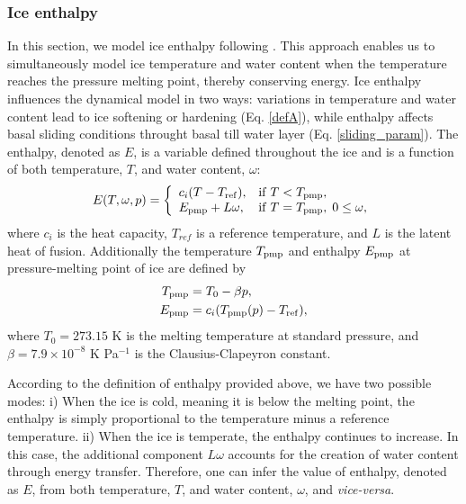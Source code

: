 \documentclass[gmd]{copernicus}
\begin{document}
\subsubsection{Ice enthalpy}
\label{phys_enthalpy}

In this section, we model ice enthalpy following \citet{aschwanden2012enthalpy}. This approach enables us to simultaneously model ice temperature and water content when the temperature reaches the pressure melting point, thereby conserving energy. Ice enthalpy influences the dynamical model in two ways: variations in temperature and water content lead to ice softening or hardening (Eq. \eqref{defA}), while enthalpy affects basal sliding conditions throught basal till water layer (Eq. \eqref{sliding_param}). The enthalpy, denoted as $E$, is a variable defined throughout the ice and is a function of both temperature, $T$, and water content, $\omega$:
\begin{align}
\label{def_enth}
E(T, \omega,p) = 
\left\{
\begin{array}{ll}
c_i (T- T_{\rm ref}), & {\rm  if } \; T < T_{\rm pmp} , \\ 
E_{\rm pmp} + L \omega, &  
{\rm if } \;  T = T_{\rm pmp},\; 0 \le \omega,
\end{array} 
\right.  
\end{align}
where $c_i$ is the heat capacity, $T_{ref}$ is a reference temperature, and $L$ is the latent heat of fusion. Additionally the temperature $T_{\rm pmp}$ and enthalpy $E_{\rm pmp}$ at pressure-melting point of ice are defined by   
\begin{align}
T_{\rm pmp} & = T_0 - \beta p, \label{defTpmp} \\
E_{\rm pmp} & = c_i (T_{\rm pmp}(p) - T_{\rm ref}), \label{defEpmp}
\end{align}  
where $T_0 = 273.15$ K is the melting temperature at standard pressure, and $\beta = 7.9 \times 10^{-8}$ K Pa$^{-1}$ is the Clausius-Clapeyron constant. 

According to the definition of enthalpy provided above, we have two possible modes: i) When the ice is cold, meaning it is below the melting point, the enthalpy is simply proportional to the temperature minus a reference temperature. ii) When the ice is temperate, the enthalpy continues to increase. In this case,  the additional component $L \omega$ accounts for the creation of water content through energy transfer. Therefore, one can infer the value of enthalpy, denoted as $E$, from both temperature, $T$, and water content, $\omega$, and \textit{vice-versa}.
\end{document}
